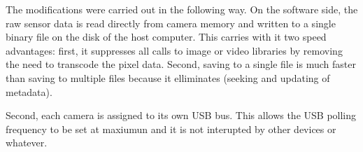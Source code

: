 The modifications were carried out in the following way.  On the software
side, the raw sensor data is read directly from camera memory and written
to a single binary file on the disk of the host computer.  This carries
with it two speed advantages: first, it suppresses all calls to image or
video libraries by removing the need to transcode the pixel data.  Second,
saving to a single file is much faster than saving to multiple files
because it elliminates (seeking and updating of metadata).

Second, each camera is assigned to its own USB bus.  This allows the USB
polling frequency to be set at maxiumun and it is not interupted by other
devices or whatever.
